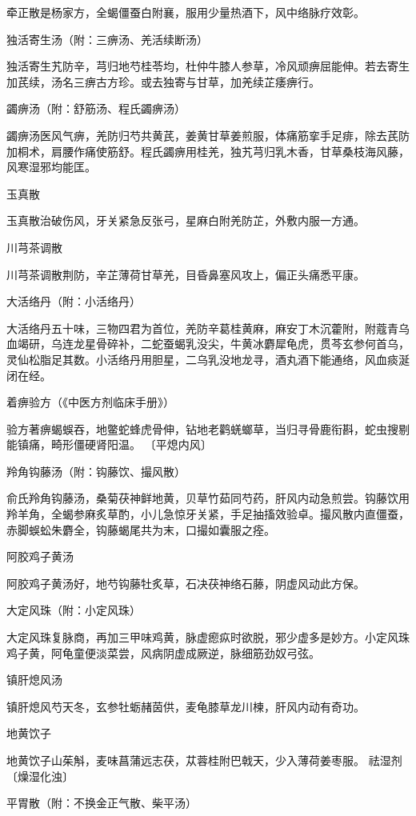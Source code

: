\documentclass[a4paper,12pt,UTF8,twoside]{ctexbook}
\begin{document}
牵正散是杨家方，全蝎僵蚕白附襄，服用少量热酒下，风中络脉疗效彰。

独活寄生汤（附：三痹汤、羌活续断汤）

独活寄生艽防辛，芎归地芍桂苓均，杜仲牛膝人参草，冷风顽痹屈能伸。若去寄生加芪续，汤名三痹古方珍。或去独寄与甘草，加羌续芷痿痹行。

蠲痹汤（附：舒筋汤、程氏蠲痹汤）

蠲痹汤医风气痹，羌防归芍共黄芪，姜黄甘草姜煎服，体痛筋挛手足痱，除去芪防加桐术，肩腰作痛使筋舒。程氏蠲痹用桂羌，独艽芎归乳木香，甘草桑枝海风藤，风寒湿邪均能匡。

玉真散

玉真散治破伤风，牙关紧急反张弓，星麻白附羌防芷，外敷内服一方通。

川芎茶调散

川芎茶调散荆防，辛芷薄荷甘草羌，目昏鼻塞风攻上，偏正头痛悉平康。

大活络丹（附：小活络丹）

大活络丹五十味，三物四君为首位，羌防辛葛桂黄麻，麻安丁木沉藿附，附蔻青乌血竭研，乌连龙星骨碎补，二蛇蚕蝎乳没尖，牛黄冰麝犀龟虎，贯芩玄参何首乌，灵仙松脂足其数。小活络丹用胆星，二乌乳没地龙寻，酒丸酒下能通络，风血痰涎闭在经。

着痹验方（《中医方剂临床手册》）

验方著痹蝎蜈吞，地鳖蛇蜂虎骨伸，钻地老鹳蜣螂草，当归寻骨鹿衔斟，蛇虫搜剔能镇痛，畸形僵硬肾阳温。
〔平熄内风〕

羚角钩藤汤（附：钩藤饮、撮风散）

俞氏羚角钩藤汤，桑菊茯神鲜地黄，贝草竹茹同芍药，肝风内动急煎尝。钩藤饮用羚羊角，全蝎参麻炙草酌，小儿急惊牙关紧，手足抽搐效验卓。撮风散内直僵蚕，赤脚蜈蚣朱麝全，钩藤蝎尾共为末，口撮如囊服之痊。

阿胶鸡子黄汤

阿胶鸡子黄汤好，地芍钩藤牡炙草，石决茯神络石藤，阴虚风动此方保。

大定风珠（附：小定风珠）

大定风珠复脉商，再加三甲味鸡黄，脉虚瘛疭时欲脱，邪少虚多是妙方。小定风珠鸡子黄，阿龟童便淡菜尝，风病阴虚成厥逆，脉细筋劲奴弓弦。

镇肝熄风汤

镇肝熄风芍天冬，玄参牡蛎赭茵供，麦龟膝草龙川楝，肝风内动有奇功。

地黄饮子

地黄饮子山茱斛，麦味菖蒲远志茯，苁蓉桂附巴戟天，少入薄荷姜枣服。
祛湿剂
〔燥湿化浊〕

平胃散（附：不换金正气散、柴平汤）
\end{document}
